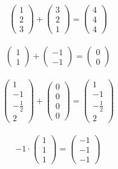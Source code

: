 \begin{Beispiel}
\begin{align*}
\begin{pmatrix}
1 \\ 2  \\  3
\end{pmatrix}  +  
\begin{pmatrix}
3 \\ 2  \\ 1
\end{pmatrix} 
=  \begin{pmatrix}
4 \\ 4  \\ 4
\end{pmatrix} 
\end{align*}

\begin{align*}
\begin{pmatrix}
 1 \\  1 
\end{pmatrix}  +  
\begin{pmatrix}
-1  \\  -1 
\end{pmatrix} 
=  \begin{pmatrix}
0  \\  0 
\end{pmatrix}  
\end{align*}

\begin{align*}
\begin{pmatrix}
1 \\ -1  \\  -\frac{1}{2}  \\ 2 
\end{pmatrix}  +  
\begin{pmatrix}
0  \\  0 \\  0 \\ 0
\end{pmatrix} 
=  \begin{pmatrix}
1 \\ -1  \\  -\frac{1}{2}  \\ 2 
\end{pmatrix} 
\end{align*}

\begin{align*}
-1 \cdot
\begin{pmatrix}
1 \\ 1  \\  1 
\end{pmatrix}  
=  \begin{pmatrix}
-1   \\ -  1    \\  -1  
\end{pmatrix} 
\end{align*}


\end{Beispiel}
